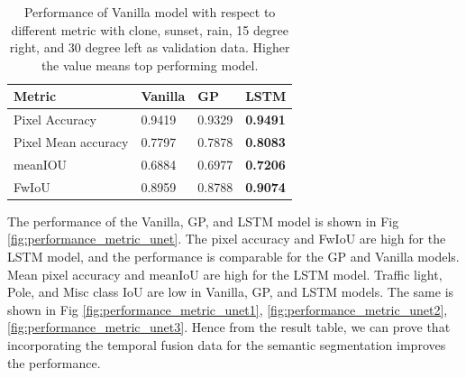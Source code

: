 	\begin{table}
		\begin{center}
			\begin{tabular}{ | l | p{4cm} | p{4cm} | p{4cm} |}
				\hline
				
				\cellcolor{purple!30}Metric & \cellcolor{purple!30}Vanilla & \cellcolor{purple!30}GP & \cellcolor{purple!30}LSTM\\ \hline
				Pixel Accuracy & 0.9419 & 0.9329 & {\bf 0.9491} \\ \hline
				Pixel Mean accuracy & 0.7797 & 0.7878 & {\bf 0.8083}  \\ \hline
				meanIOU & 0.6884 & 0.6977 & {\bf 0.7206} \\ \hline
				FwIoU & 0.8959 & 0.8788 & {\bf 0.9074} \\ \hline
				\hline
			\end{tabular}
			\caption{Performance of Vanilla model with respect to different metric with clone, sunset, rain, 15 degree right, and 30 degree left as validation data. Higher the value means top performing model.}
			\label{table:Vanilla_conti_seq}
		\end{center}
	\end{table}
	
	The performance of the Vanilla, GP, and LSTM model is shown in Fig \ref{fig:performance_metric_unet}. The pixel accuracy and  FwIoU are high for the LSTM model, and the performance is comparable for the GP and Vanilla models. Mean pixel accuracy and meanIoU are high for the LSTM model. Traffic light, Pole, and Misc class IoU are low in Vanilla, GP, and LSTM models. The same is shown in Fig \ref{fig:performance_metric_unet1}, \ref{fig:performance_metric_unet2}, \ref{fig:performance_metric_unet3}. Hence from the result table, we can prove that incorporating the temporal fusion data for the semantic segmentation improves the performance. 

